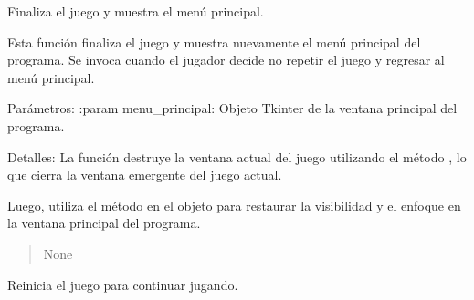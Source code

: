 \documentclass[letterpaper,10pt,spanish]{sphinxmanual}
\begin{document}
\begin{fulllineitems}
\begin{fulllineitems}
\begin{quote}
\begin{description}
\end{description}\end{quote}

\end{fulllineitems}


\begin{fulllineitems}
\label{\detokenize{juego:juego.Juego.repetir_no}}
\pysigstartsignatures
{}
\pysigstopsignatures
\sphinxAtStartPar
Finaliza el juego y muestra el menú principal.

\sphinxAtStartPar
Esta función finaliza el juego y muestra nuevamente el menú principal del programa.
Se invoca cuando el jugador decide no repetir el juego y regresar al menú principal.

\sphinxAtStartPar
Parámetros:
:param menu\_principal: Objeto Tkinter de la ventana principal del programa.

\sphinxAtStartPar
Detalles:
La función destruye la ventana actual del juego utilizando el método , lo que
cierra la ventana emergente del juego actual.

\sphinxAtStartPar
Luego, utiliza el método  en el objeto  para restaurar la
visibilidad y el enfoque en la ventana principal del programa.
\begin{quote}\begin{description}
\sphinxAtStartPar
None

\end{description}\end{quote}

\end{fulllineitems}


\begin{fulllineitems}
\label{\detokenize{juego:juego.Juego.repetir_si}}
\pysigstartsignatures
{}
\pysigstopsignatures
\sphinxAtStartPar
Reinicia el juego para continuar jugando.


\end{fulllineitems}
\end{fulllineitems}
\end{document}
